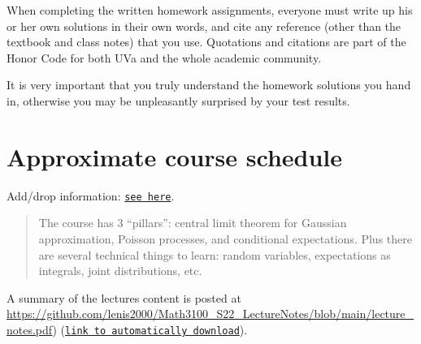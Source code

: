 \documentclass[oneside,11pt]{amsart}
\begin{document}
When completing the written homework assignments, everyone must write up his or her own
solutions in their own words, and cite any reference 
(other than the textbook and
class notes) that you use. Quotations and citations are part of the Honor Code for both UVa
and the whole academic community. 

It is very important that you truly understand the homework solutions you hand
in, otherwise you may be unpleasantly surprised by your test results.

\section{Approximate course schedule}

\noindent Add/drop information: \href{https://registrar.virginia.edu/enrollment-information/spring-2022-enrollment-instruction}{\texttt{see here}}.
\bigskip

\begin{quote}
	The course has 3 ``pillars'': central limit theorem for Gaussian approximation, 
	Poisson processes, and conditional expectations. 
	Plus there are several technical things to learn: random variables, expectations as integrals, 
	joint distributions, etc.
\end{quote}

\bigskip

A summary of the lectures content is posted at 
\url{https://github.com/lenis2000/Math3100_S22_LectureNotes/blob/main/lecture_notes.pdf})
(\href{https://github.com/lenis2000/Math3100_S22_LectureNotes/raw/main/lecture_notes.pdf}
{\texttt{link to automatically download}}).

\bigskip
\end{document}

